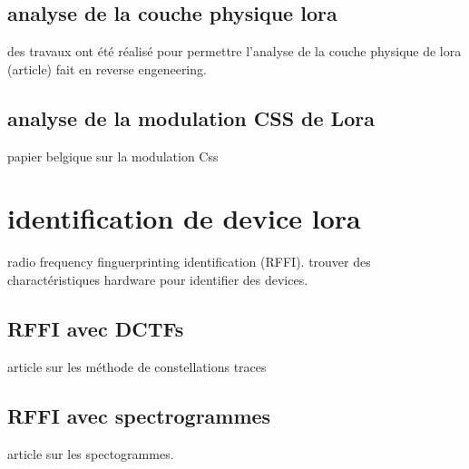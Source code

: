 \subsection{analyse de la couche physique lora}

des travaux ont été réalisé pour permettre l'analyse de la couche physique de lora (article)
fait en reverse engeneering. 

\subsection{analyse de la modulation CSS de Lora}

papier belgique sur la modulation Css

\section{identification de device lora}

radio frequency finguerprinting identification (RFFI). trouver des charactéristiques hardware pour identifier des devices.

\subsection{RFFI avec DCTFs}
article sur les méthode de constellations traces

\subsection{RFFI avec spectrogrammes}
article sur les spectogrammes.